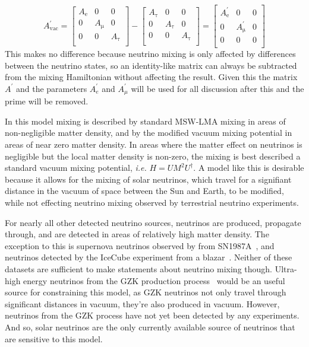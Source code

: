 \begin{equation}
A_{\mathrm{vac}}^{\prime} =
\begin{bmatrix}
    A_{\mathrm{e}} & 0 & 0  \\
    0 &  A_{\mathrm{\mu}} & 0  \\
    0 & 0 &  A_{\mathrm{\tau}}  \\
\end{bmatrix} - 
\begin{bmatrix}
    A_{\mathrm{\tau}} & 0 & 0  \\
    0 &  A_{\mathrm{\tau}} & 0  \\
    0 & 0 &  A_{\mathrm{\tau}}  \\ 
\end{bmatrix} 
= 
\begin{bmatrix}
    A_{\mathrm{e}}^{\prime} & 0 & 0  \\
    0 &  A_{\mathrm{\mu}}^{\prime} & 0  \\
    0 & 0 &  0  \\ 
\end{bmatrix}  
\end{equation}
This makes no difference because neutrino mixing is only affected by differences
between the neutrino states, so an identity-like matrix can always be subtracted
from the mixing Hamiltonian without affecting the result.
Given this the matrix $A^{\prime}$ and the parameters $A_{e}^{\prime}$ and $A_{\mu}^{\prime}$
 will be used for all discussion after this and the prime will be removed.

In this model mixing is described by standard MSW-LMA mixing in areas of
non-negligible matter density, and by the modified vacuum mixing potential
in areas of near zero matter density.
In areas where the matter effect on neutrinos is negligible but the local
matter density is non-zero, the mixing is best described a standard
vacuum mixing potential, \textit{i.e.} $H = UM^{2}U^{\dagger}$.
A model like this is desirable because it allows for the mixing of solar neutrinos, which
travel for a signifiant distance in the vacuum of space between the Sun and Earth,
to be modified, while not effecting neutrino mixing observed by terrestrial neutrino experiments.

For nearly all other detected neutrino sources, neutrinos are produced, propagate through,
and are detected in areas of relatively high matter density.
The exception to this is supernova neutrinos observed by from SN1987A~\citep{kamiokande_sn, imb_sn, baksan_sn},
and neutrinos detected by the IceCube experiment from a blazar~\citep{icecube_blazar}.
Neither of these datasets are sufficient to make statements
about neutrino mixing though.
Ultra-high energy neutrinos from the GZK production process~\citep{gzk} would be an useful
source for constraining this model, as GZK neutrinos not only travel through
significant distances in vacuum, they're also produced in vacuum.
However, neutrinos from the GZK process have not yet been detected by
any experiments.
And so, solar neutrinos are the only currently available source
of neutrinos that are sensitive to this model.

